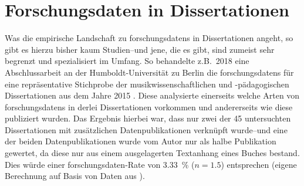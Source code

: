 \section{Forschungsdaten in Dissertationen}\label{sec:forschungsstand-diss}
Was die empirische Landschaft zu \glspl{forschungsdaten} in Dissertationen angeht, so gibt es hierzu bisher kaum Studien--und jene, die es gibt, sind zumeist sehr begrenzt und spezialisiert im Umfang.
So behandelte z.B.~2018 eine Abschlussarbeit an der Humboldt-Universität zu Berlin die \glspl{forschungsdaten} für eine repräsentative Stichprobe der musikwissenschaftlichen und -pädagogischen Dissertationen aus dem Jahre 2015 \autocite{Wünsche2018Forschungsdaten}.
Diese analysierte einerseits welche Arten von \glspl{forschungsdaten} in derlei Dissertationen vorkommen und andererseits wie diese publiziert wurden.
Das Ergebnis hierbei war, dass nur zwei der \num{45} untersuchten Dissertationen mit zusätzlichen Datenpublikationen verknüpft wurde--und eine der beiden Datenpublikationen wurde vom Autor nur als halbe Publikation gewertet, da diese nur aus einem ausgelagerten Textanhang eines Buches bestand.
Dies würde einer \gls{forschungsdaten}-Rate von \SI{3.33}{\percent} ($n=\num{1.5}$) entsprechen (eigene Berechnung auf Basis von Daten aus \autocite{Wünsche2018Forschungsdaten}).

